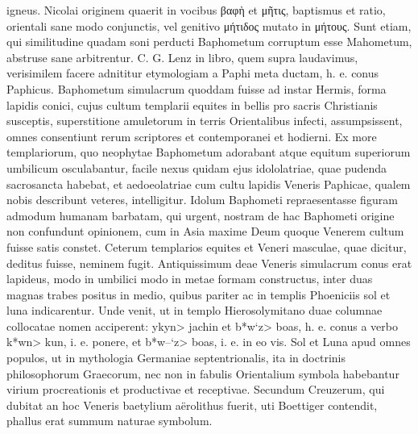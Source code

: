 \documentclass[a4paper, 11pt, oneside, polutonikogreek, german]{article}
\begin{document}
igneus. Nicolai originem quaerit in vocibus βαφὴ et μῆτις, baptismus et ratio, orientali sane modo conjunctis, vel genitivo μήτιδος mutato in μήτους. Sunt etiam, qui similitudine quadam soni perducti Baphometum corruptum esse Mahometum, abstruse sane arbitrentur. C. G. Lenz in libro, quem supra laudavimus, verisimilem facere adnititur etymologiam a Paphi meta ductam, h. e. conus Paphicus. Baphometum simulacrum quoddam fuisse ad instar Hermis, forma lapidis conici, cujus cultum templarii equites in bellis pro sacris Christianis susceptis, superstitione amuletorum in terris Orientalibus infecti, assumpsissent, omnes consentiunt rerum scriptores et contemporanei et hodierni. Ex more templariorum, quo neophytae Baphometum adorabant atque equitum superiorum umbilicum osculabantur, facile nexus quidam ejus idololatriae, quae pudenda sacrosancta habebat, et aedoeolatriae cum cultu lapidis Veneris Paphicae, qualem nobis describunt veteres, intelligitur. Idolum Baphometi repraesentasse figuram admodum humanam barbatam, qui urgent, nostram de hac Baphometi origine non confundunt opinionem, cum in Asia maxime Deum quoque Venerem cultum fuisse satis constet. Ceterum templarios equites et Veneri masculae, quae dicitur, deditus fuisse, neminem fugit. Antiquissimum deae Veneris simulacrum conus erat lapideus, modo in umbilici modo in metae formam constructus, inter duas magnas trabes positus in medio, quibus pariter ac in templis Phoeniciis sol et luna indicarentur. Unde venit, ut in templo Hierosolymitano duae columnae collocatae nomen acciperent: \<ykyn> jachin et \<b*w`z> boas, h. e. conus a verbo \<k*wn> kun, i. e. ponere, et \<b*w--`z> boas, i. e. in eo vis. Sol et Luna apud omnes populos, ut in mythologia Germaniae septentrionalis, ita in doctrinis philosophorum Graecorum, nec non in fabulis Orientalium symbola habebantur virium procreationis et productivae et receptivae. Secundum Creuzerum, qui dubitat an hoc Veneris baetylium aërolithus fuerit, uti Boettiger contendit, phallus erat summum naturae symbolum.
\end{document}
